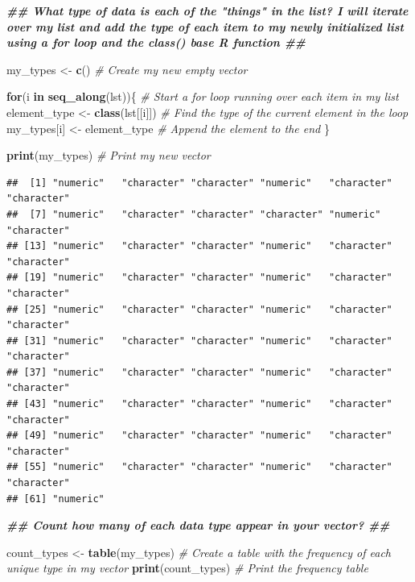 \documentclass[
]{article}
\newenvironment{Shaded}{\begin{snugshade}}{\end{snugshade}}
\newcommand{\CommentTok}[1]{\textcolor[rgb]{0.56,0.35,0.01}{\textit{#1}}}
\newcommand{\ControlFlowTok}[1]{\textcolor[rgb]{0.13,0.29,0.53}{\textbf{#1}}}
\newcommand{\DocumentationTok}[1]{\textcolor[rgb]{0.56,0.35,0.01}{\textbf{\textit{#1}}}}
\newcommand{\FunctionTok}[1]{\textcolor[rgb]{0.13,0.29,0.53}{\textbf{#1}}}
\newcommand{\NormalTok}[1]{#1}
\newcommand{\OtherTok}[1]{\textcolor[rgb]{0.56,0.35,0.01}{#1}}
\begin{document}
\begin{Shaded}
\begin{Highlighting}[]
\DocumentationTok{\#\# What type of data is each of the "things" in the list? I will iterate over my list and add the type of each item to my newly initialized list using a for loop and the class() base R function \#\#}

\NormalTok{my\_types }\OtherTok{\textless{}{-}} \FunctionTok{c}\NormalTok{() }\CommentTok{\# Create my new empty vector}

\ControlFlowTok{for}\NormalTok{(i }\ControlFlowTok{in} \FunctionTok{seq\_along}\NormalTok{(lst))\{ }\CommentTok{\# Start a for loop running over each item in my list}
\NormalTok{  element\_type }\OtherTok{\textless{}{-}} \FunctionTok{class}\NormalTok{(lst[[i]]) }\CommentTok{\# Find the type of the current element in the loop}
\NormalTok{  my\_types[i] }\OtherTok{\textless{}{-}}\NormalTok{ element\_type }\CommentTok{\# Append the element to the end}
\NormalTok{\}}

\FunctionTok{print}\NormalTok{(my\_types) }\CommentTok{\# Print my new vector }
\end{Highlighting}
\end{Shaded}

\begin{verbatim}
##  [1] "numeric"   "character" "character" "numeric"   "character" "character"
##  [7] "numeric"   "character" "character" "character" "numeric"   "character"
## [13] "numeric"   "character" "character" "numeric"   "character" "character"
## [19] "numeric"   "character" "character" "numeric"   "character" "character"
## [25] "numeric"   "character" "character" "numeric"   "character" "character"
## [31] "numeric"   "character" "character" "numeric"   "character" "character"
## [37] "numeric"   "character" "character" "numeric"   "character" "character"
## [43] "numeric"   "character" "character" "numeric"   "character" "character"
## [49] "numeric"   "character" "character" "numeric"   "character" "character"
## [55] "numeric"   "character" "character" "numeric"   "character" "character"
## [61] "numeric"
\end{verbatim}

\begin{Shaded}
\begin{Highlighting}[]
\DocumentationTok{\#\# Count how many of each data type appear in your vector? \#\#}

\NormalTok{count\_types }\OtherTok{\textless{}{-}} \FunctionTok{table}\NormalTok{(my\_types) }\CommentTok{\# Create a table with the frequency of each unique type in my vector}
\FunctionTok{print}\NormalTok{(count\_types) }\CommentTok{\# Print the frequency table}
\end{Highlighting}
\end{Shaded}
\end{document}
